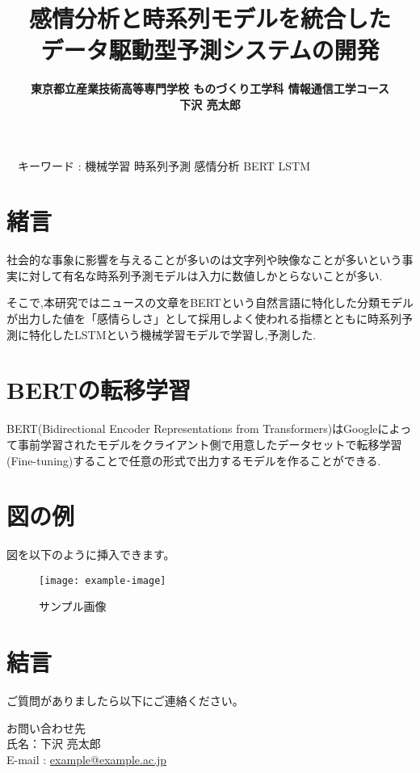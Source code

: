 \documentclass[a4paper,11pt]{article}
\title{{\TitleJFont\bfseries 感情分析と時系列モデルを統合した\\データ駆動型予測システムの開発 \\ }}
\author{\large\TitleJFont\bfseries 東京都立産業技術高等専門学校 ものづくり工学科 情報通信工学コース \\ \large\TitleJFont\bfseries 下沢 亮太郎}
\date{}
\newenvironment{customabstract}
{\noindent\hfuzz=10pt\hbadness=10000\begin{flushleft}\small}
{\end{flushleft}}
\begin{document}
\maketitle
\thispagestyle{empty}

\begin{customabstract}
　キーワード : 機械学習 時系列予測 感情分析 BERT LSTM
\end{customabstract}

\setlength{\columnsep}{40pt}


\begin{multicols*}{2}

\section{緒言}
社会的な事象に影響を与えることが多いのは文字列や映像なことが多いという事実に対して有名な時系列予測モデルは入力に数値しかとらないことが多い.

そこで,本研究ではニュースの文章をBERTという自然言語に特化した分類モデルが出力した値を「感情らしさ」として採用しよく使われる指標とともに時系列予測に特化したLSTMという機械学習モデルで学習し,予測した.

\section{BERTの転移学習}
BERT(Bidirectional Encoder Representations from Transformers)はGoogleによって事前学習されたモデルをクライアント側で用意したデータセットで転移学習(Fine-tuning)することで任意の形式で出力するモデルを作ることができる.



\section{図の例}
図を以下のように挿入できます。
\begin{figure}[h]
    \centering
    \texttt{[image: example-image]} %
    \caption{サンプル画像}
\end{figure}

\section{結言}
ご質問がありましたら以下にご連絡ください。

\noindent
{}
お問い合わせ先\\
氏名：下沢 亮太郎 \\
E-mail : \href{mailto:example@example.ac.jp}{example@example.ac.jp}

\end{multicols*}
\end{document}
